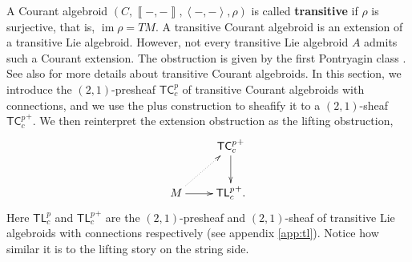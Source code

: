 \documentclass[letterpaper,10pt, oneside]{article} %
\newcommand{\tlp}{{\mathsf{TL}^{p}_{c}}} %
\newcommand{\tcalgdp}{{\mathsf{TC}^{p}_{c}}} %
\DeclareMathOperator{\im}{im}
\newcommand{\pair}[1]{\left\langle #1\right\rangle}
\newcommand{\Courant}[1]{\left\llbracket  #1\right\rrbracket }
\begin{document}
A Courant algebroid $(C,\Courant{-,-},\pair{-,-},\rho)$ is called {\bf transitive} if $\rho$ is surjective, that is, $\im \rho=TM$. A transitive Courant algebroid is an extension of a transitive Lie algebroid. However, not every transitive Lie algebroid $A$ admits such a Courant extension. The obstruction is given by the first Pontryagin class \cite{Bressler:Pclass,ChenRCA,sev15}.  See also \cite{MK2,Vai05} for more details about transitive Courant algebroids. In this section, we introduce the $(2,1)$-presheaf $\tcalgdp$ of transitive Courant algebroids with
connections, and we use the plus construction to sheafify it to a $(2,1)$-sheaf ${\tcalgdp}^+$. We then reinterpret the extension obstruction as the lifting obstruction,
\begin{equation}
\xymatrix{
&\tcalgdp^+\ar[d]\\
M \ar@{.>}[ur]\ar[r]&\tlp^+.
}
\end{equation}
Here $\tlp$ and $\tlp^+$ are the $(2,1)$-presheaf and $(2,1)$-sheaf of transitive Lie algebroids with connections respectively (see appendix \ref{app:tl}).
Notice how similar it is to the lifting story on the string side.
\end{document}
